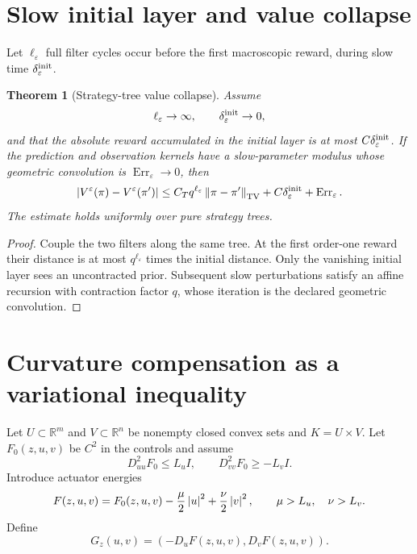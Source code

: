 \documentclass[11pt,reqno]{amsart}
\newtheorem{theorem}{Theorem}[section]
\theoremstyle{definition}
\theoremstyle{remark}
\newcommand{\R}{\mathbb R}
\newcommand{\TV}{\mathrm{TV}}
\newcommand{\norm}[1]{\left\lVert #1\right\rVert}
\newcommand{\abs}[1]{\left\lvert #1\right\rvert}
\begin{document}
\section{Slow initial layer and value collapse}\label{sec:initial}
Let $\ell_\varepsilon$ full filter cycles occur before the first macroscopic
reward, during slow time $\delta_\varepsilon^{\rm init}$.

\begin{theorem}[Strategy-tree value collapse]\label{thm:collapse}
Assume
\[
 \ell_\varepsilon\to\infty,
 \qquad\delta_\varepsilon^{\rm init}\to0,
\]
and that the absolute reward accumulated in the initial layer is at most
$C\delta_\varepsilon^{\rm init}$.  If the prediction and observation kernels
have a slow-parameter modulus whose geometric convolution is
$\operatorname{Err}_\varepsilon\to0$, then
\[
 \abs{V^\varepsilon(\pi)-V^\varepsilon(\pi')}
 \le C_Tq^{\ell_\varepsilon}
 \norm{\pi-\pi'}_{\TV}
 +C\delta_\varepsilon^{\rm init}
 +\operatorname{Err}_\varepsilon.
\]
The estimate holds uniformly over pure strategy trees.
\end{theorem}

\begin{proof}
Couple the two filters along the same tree.  At the first order-one reward their
distance is at most $q^{\ell_\varepsilon}$ times the initial distance.  Only
the vanishing initial layer sees an uncontracted prior.  Subsequent slow
perturbations satisfy an affine recursion with contraction factor $q$, whose
iteration is the declared geometric convolution.
\end{proof}

\section{Curvature compensation as a variational inequality}\label{sec:VI}
Let $U\subset\R^m$ and $V\subset\R^n$ be nonempty closed convex sets and
$K=U\times V$.  Let $F_0(z,u,v)$ be $C^2$ in the controls and assume
\begin{equation}\label{eq:hessian}
 D_{uu}^2F_0\le L_u I,
 \qquad
 D_{vv}^2F_0\ge-L_v I.
\end{equation}
Introduce actuator energies
\begin{equation}\label{eq:energy}
 F(z,u,v)=F_0(z,u,v)-{\mu\over2}\abs u^2
 +{\nu\over2}\abs v^2,
 \qquad\mu>L_u,\quad\nu>L_v.
\end{equation}
Define
\[
 G_z(u,v)=(-D_uF(z,u,v),D_vF(z,u,v)).
\]
\end{document}
